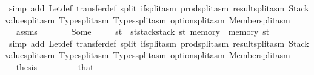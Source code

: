\begin{isabellebody}
\ {\isacharparenleft}{\kern0pt}simp\ add{\isacharcolon}{\kern0pt}\ Let{\isacharunderscore}{\kern0pt}def\ transfer{\isacharunderscore}{\kern0pt}def\ split{\isacharcolon}{\kern0pt}\ if{\isacharunderscore}{\kern0pt}split{\isacharunderscore}{\kern0pt}asm\ prod{\isachardot}{\kern0pt}split{\isacharunderscore}{\kern0pt}asm\ result{\isachardot}{\kern0pt}split{\isacharunderscore}{\kern0pt}asm\ Stackvalue{\isachardot}{\kern0pt}split{\isacharunderscore}{\kern0pt}asm\ Type{\isachardot}{\kern0pt}split{\isacharunderscore}{\kern0pt}asm\ Types{\isachardot}{\kern0pt}split{\isacharunderscore}{\kern0pt}asm\ option{\isachardot}{\kern0pt}split{\isacharunderscore}{\kern0pt}asm\ Member{\isachardot}{\kern0pt}split{\isacharunderscore}{\kern0pt}asm{\isacharparenright}{\kern0pt}\isanewline
\ \ \ \ \isamarkupfalse%
\ \isamarkupfalse%
\ assms\ {}\ {}\ {}\ {}\ {}\ {}\ {}\ Some\ {}\ {}\ {}{}\ \isamarkupfalse%
\ {\isachardoublequoteopen}st{\isacharprime}{\kern0pt}\ {\isacharequal}{\kern0pt}\ st{\isacharprime}{\kern0pt}{\isacharprime}{\kern0pt}{\isasymlparr}stack{\isacharcolon}{\kern0pt}{\isacharequal}{\kern0pt}stack\ st{\isacharcomma}{\kern0pt}\ memory\ {\isacharcolon}{\kern0pt}{\isacharequal}{\kern0pt}\ memory\ st{\isasymrparr}{\isachardoublequoteclose}\ \isamarkupfalse%
\ {\isacharparenleft}{\kern0pt}simp\ add{\isacharcolon}{\kern0pt}\ Let{\isacharunderscore}{\kern0pt}def\ transfer{\isacharunderscore}{\kern0pt}def\ split{\isacharcolon}{\kern0pt}\ if{\isacharunderscore}{\kern0pt}split{\isacharunderscore}{\kern0pt}asm\ prod{\isachardot}{\kern0pt}split{\isacharunderscore}{\kern0pt}asm\ result{\isachardot}{\kern0pt}split{\isacharunderscore}{\kern0pt}asm\ Stackvalue{\isachardot}{\kern0pt}split{\isacharunderscore}{\kern0pt}asm\ Type{\isachardot}{\kern0pt}split{\isacharunderscore}{\kern0pt}asm\ Types{\isachardot}{\kern0pt}split{\isacharunderscore}{\kern0pt}asm\ option{\isachardot}{\kern0pt}split{\isacharunderscore}{\kern0pt}asm\ Member{\isachardot}{\kern0pt}split{\isacharunderscore}{\kern0pt}asm{\isacharparenright}{\kern0pt}\isanewline
\ \ \ \ \isamarkupfalse%
\ \isamarkupfalse%
\ {\isacharquery}{\kern0pt}thesis\ \isamarkupfalse%
\ {}\ {}\ {}\ {}\ {}\ {}\ {}\ that{\isacharparenleft}{\kern0pt}{}{\isacharparenright}{\kern0pt}\ \isamarkupfalse%

\end{isabellebody}
